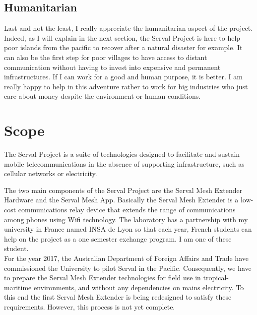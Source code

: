 \subsection{Humanitarian}
Last and not the least, I really appreciate the humanitarian aspect of the project. Indeed, as I will explain in the next section, the Serval Project is here to help poor islands from the pacific to recover after a natural disaster for example. It can also be the first step for poor villages to have access to distant communication without having to invest into expensive and permanent infrastructures. If I can work for a good and human purpose, it is better. I am really happy to help in this adventure rather to work for big industries who just care about money despite the environment or human conditions. 

\section{Scope}
The Serval Project is a suite of technologies designed to facilitate and sustain mobile telecommunications in the absence of supporting infrastructure, such as cellular networks or electricity. \par The two main components of the Serval Project are the Serval Mesh Extender Hardware and the Serval Mesh App. Basically the Serval Mesh Extender is a low-cost communications relay device that extends the range of communications among phones using Wifi technology. The laboratory has a partnership with my university in France named INSA de Lyon so that each year, French students can help on the project as a one semester exchange program. I am one of these student. \\

For the year 2017, the Australian Department of Foreign Affairs and Trade have commissioned the University to pilot Serval in the Pacific. Consequently, we have to prepare the Serval Mesh Extender technologies for field use in tropical-maritime environments, and without any dependencies on mains electricity. To this end the first Serval Mesh Extender is being redesigned to satisfy these requirements. However, this process is not yet complete. \\

